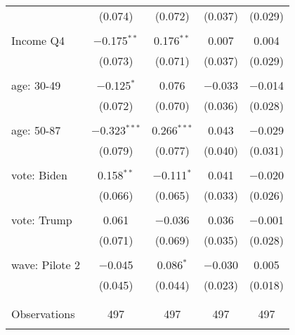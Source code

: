 \begin{tabular}{@{\extracolsep{5pt}}lcccc}
  & (0.074) & (0.072) & (0.037) & (0.029) \\ 
  & & & & \\ 
 Income Q4 & $-$0.175$^{**}$ & 0.176$^{**}$ & 0.007 & 0.004 \\ 
  & (0.073) & (0.071) & (0.037) & (0.029) \\ 
  & & & & \\ 
 age: 30-49 & $-$0.125$^{*}$ & 0.076 & $-$0.033 & $-$0.014 \\ 
  & (0.072) & (0.070) & (0.036) & (0.028) \\ 
  & & & & \\ 
 age: 50-87 & $-$0.323$^{***}$ & 0.266$^{***}$ & 0.043 & $-$0.029 \\ 
  & (0.079) & (0.077) & (0.040) & (0.031) \\ 
  & & & & \\ 
 vote: Biden & 0.158$^{**}$ & $-$0.111$^{*}$ & 0.041 & $-$0.020 \\ 
  & (0.066) & (0.065) & (0.033) & (0.026) \\ 
  & & & & \\ 
 vote: Trump & 0.061 & $-$0.036 & 0.036 & $-$0.001 \\ 
  & (0.071) & (0.069) & (0.035) & (0.028) \\ 
  & & & & \\ 
 wave: Pilote 2 & $-$0.045 & 0.086$^{*}$ & $-$0.030 & 0.005 \\ 
  & (0.045) & (0.044) & (0.023) & (0.018) \\ 
  & & & & \\ 
\hline \\[-1.8ex] 

Observations & 497 & 497 & 497 & 497 \\ 
\hline 
\hline \\[-1.8ex] 
\end{tabular} 